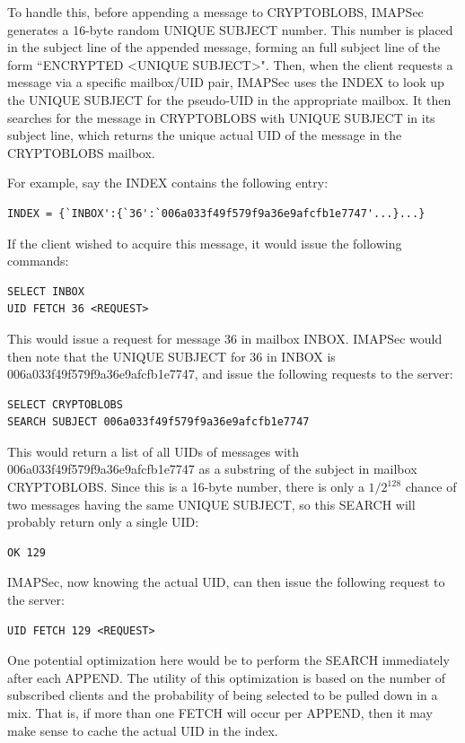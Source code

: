 \documentclass[pageno]{jpaper}
\newcommand{\project}{IMAPSec }
\newcommand{\projectnospace}{IMAPSec}
\begin{document}
To handle this, before appending a message to CRYPTOBLOBS, \project generates a 16-byte random UNIQUE SUBJECT number. This number is placed in the subject line of the appended message, forming an full subject line of the form ``ENCRYPTED <UNIQUE SUBJECT>". Then, when the client requests a message via a specific mailbox/UID pair, \project uses the INDEX to look up the UNIQUE SUBJECT for the pseudo-UID in the appropriate mailbox. It then searches for the message in CRYPTOBLOBS with UNIQUE SUBJECT in its subject line, which returns the unique actual UID of the message in the CRYPTOBLOBS mailbox.

For example, say the INDEX contains the following entry:

\begin{lstlisting}
INDEX = {`INBOX':{`36':`006a033f49f579f9a36e9afcfb1e7747'...}...}
\end{lstlisting}

If the client wished to acquire this message, it would issue the following commands:

\begin{lstlisting}
SELECT INBOX
UID FETCH 36 <REQUEST>
\end{lstlisting}

This would issue a request for message 36 in mailbox INBOX. \project would then note that
the UNIQUE SUBJECT for 36 in INBOX is 006a033f49f579f9a36e9afcfb1e7747, and issue the following requests to the server:

\begin{lstlisting}
SELECT CRYPTOBLOBS
SEARCH SUBJECT 006a033f49f579f9a36e9afcfb1e7747
\end{lstlisting}

This would return a list of all UIDs of messages with 006a033f49f579f9a36e9afcfb1e7747 as a substring of the subject in mailbox CRYPTOBLOBS. Since this is a 16-byte number, there is only a $1/2^{128}$ chance of two messages having the same UNIQUE SUBJECT, so this SEARCH will probably return only a single UID:

\begin{lstlisting}
OK 129
\end{lstlisting}


\projectnospace, now knowing the actual UID, can then issue the following request to the server:

\begin{lstlisting}
UID FETCH 129 <REQUEST>
\end{lstlisting}

One potential optimization here would be to perform the SEARCH immediately after each APPEND. The utility of this optimization is based on the number of subscribed clients and the probability of being selected to be pulled down in a mix. That is, if more than one FETCH will occur per APPEND, then it may make sense to cache the actual UID in the index.
\end{document}
